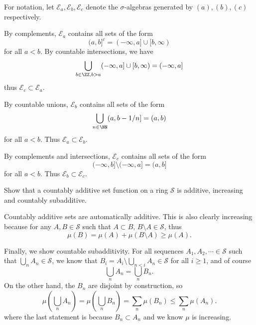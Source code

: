 \documentclass[11pt, headheight=30pt]{scrartcl}
\begin{document}
For notation, let
$\mathcal{E}_a, \mathcal{E}_b, \mathcal{E}_c$ denote the $\sigma$-algebras
generated by $(a), (b), (c)$ respectively.

\begin{psec*}
    By complements, $\mathcal{E}_a$ contains all sets of the form
    \[
        (a,b]^c = (-\infty, a] \cup [b, \infty)
    \]
    for all $a < b$. By countable intersections, we have
    \[
        \bigcup_{b\in \ZZ, b > a} (-\infty, a] \cup [b, \infty) = (-\infty, a]  
    \]
    thus $\mathcal{E}_c\subset \mathcal{E}_a$.
\end{psec*}

\begin{psec*}
    By countable unions, $\mathcal{E}_b$ contains all sets of the form
    \[
        \bigcup_{n\in \NN} (a, b - 1/n] = (a,b)
    \]
    for all $a < b$. Thus $\mathcal{E}_a\subset \mathcal{E}_b$.
\end{psec*}

\begin{psec*}
    By complements and intersections, $\mathcal{E}_c$ contains all sets of the form
    \[
        (-\infty, b] \setminus (-\infty, a] = (a,b]
    \]
    for all $a < b$. Thus $\mathcal{E}_b\subset \mathcal{E}_c$.
\end{psec*}


\begin{prob}
    Show that a countably additive set function on a ring $\mathcal{S}$
    is additive, increasing and countably subadditive.
\end{prob}

Countably additive sets are automatically
additive. This is also clearly increasing because
for any $A, B\in \mathcal{S}$ such that $A\subset B$,
$B\setminus A\in \mathcal{S}$, thus
\[
    \mu\left(B\right) = \mu\left(A\right) + \mu\left(B\setminus A\right)
    \geq \mu\left(A\right).    
\]

Finally, we show countable subadditivity. For all sequences
$A_1, A_2, \cdots \in \mathcal{S}$
such that $\bigcup_n A_n \in \mathcal{S}$, we know that
$B_i = A_i \setminus \bigcup_{n < i} A_n \in \mathcal{S}$
for all $i\geq 1$, and of course
\[
    \bigcup_n A_n = \bigcup_n B_n.    
\]
On the other hand, the $B_n$ are disjoint by construction, so
\[
    \mu\left(\bigcup_n A_n\right) = \mu\left(\bigcup_n B_n\right)
    = \sum_n \mu\left(B_n\right) \leq \sum_n \mu\left(A_n\right).
\]
where the last statement is because $B_n\subset A_n$
and we know $\mu$ is increasing.
\end{document}
